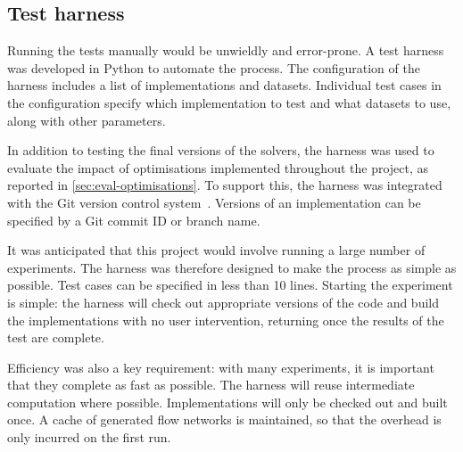 
\subsection{Test harness} \label{sec:impl-benchmark-harness}

Running the tests manually would be unwieldly and error-prone. A test harness was developed in Python to automate the process. The configuration of the harness includes a list of implementations and datasets. Individual test cases in the configuration specify which implementation to test and what datasets to use, along with other parameters.

In addition to testing the final versions of the solvers, the harness was used to evaluate the impact of optimisations implemented throughout the project, as reported in \cref{sec:eval-optimisations}. To support this, the harness was integrated with the Git version control system~\cite{GitWWW}. Versions of an implementation can be specified by a Git commit ID or branch name.

It was anticipated that this project would involve running a large number of experiments. The harness was therefore designed to make the process as simple as possible. Test cases can be specified in less than 10 lines. Starting the experiment is simple: the harness will check out appropriate versions of the code and build the implementations with no user intervention, returning once the results of the test are complete.

Efficiency was also a key requirement: with many experiments, it is important that they complete as fast as possible. The harness will reuse intermediate computation where possible. Implementations will only be checked out and built once. A cache of generated flow networks is maintained\footnotemark, so that the overhead is only incurred on the first run.


